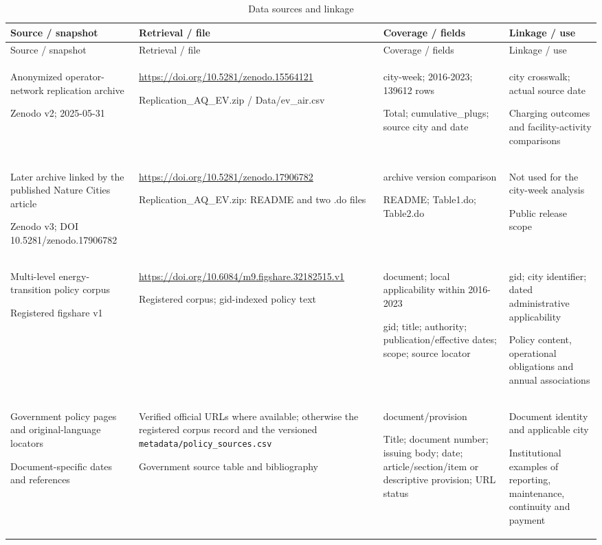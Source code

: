 \begingroup\footnotesize\setlength{\tabcolsep}{3pt}\begin{longtable}{@{}>{\raggedright\arraybackslash}p{33mm}>{\raggedright\arraybackslash}p{42mm}>{\raggedright\arraybackslash}p{35mm}>{\raggedright\arraybackslash}p{42mm}@{}}
\caption{Data sources and linkage}\label{tab:data-provenance}\\\toprule
Source / snapshot & Retrieval / file & Coverage / fields & Linkage / use\\\midrule
\endfirsthead\toprule
Source / snapshot & Retrieval / file & Coverage / fields & Linkage / use\\\midrule
\endhead\bottomrule\endfoot
Anonymized operator-network replication archive\par Zenodo v2; 2025-05-31 & \url{https://doi.org/10.5281/zenodo.15564121}\par Replication\_\allowbreak{}AQ\_\allowbreak{}EV.zip /\allowbreak{} Data/\allowbreak{}ev\_\allowbreak{}air.csv & city-week; 2016-2023; 139612 rows\par Total; cumulative\_\allowbreak{}plugs; source city and date & city crosswalk; actual source date\par Charging outcomes and facility-activity comparisons\\[3pt]
Later archive linked by the published Nature Cities article\par Zenodo v3; DOI 10.5281/\allowbreak{}zenodo.17906782 & \url{https://doi.org/10.5281/zenodo.17906782}\par Replication\_\allowbreak{}AQ\_\allowbreak{}EV.zip: README and two .do files & archive version comparison\par README; Table1.do; Table2.do & Not used for the city-week analysis\par Public release scope\\[3pt]
Multi-level energy-transition policy corpus\par Registered figshare v1 & \url{https://doi.org/10.6084/m9.figshare.32182515.v1}\par Registered corpus; gid-indexed policy text & document; local applicability within 2016-2023\par gid; title; authority; publication/\allowbreak{}effective dates; scope; source locator & gid; city identifier; dated administrative applicability\par Policy content, operational obligations and annual associations\\[3pt]
Government policy pages and original-language locators\par Document-specific dates and references & Verified official URLs where available; otherwise the registered corpus record and the versioned \texttt{metadata/}\allowbreak{}\texttt{policy\_sources.csv}\par Government source table and bibliography & document/\allowbreak{}provision\par Title; document number; issuing body; date; article/section/item or descriptive provision; URL status & Document identity and applicable city\par Institutional examples of reporting, maintenance, continuity and payment\\[3pt]

\end{longtable}
